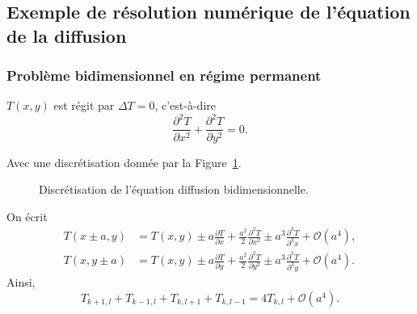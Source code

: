     \subsection{Exemple de résolution numérique de l'équation de la diffusion}
        \subsubsection{Problème bidimensionnel en régime permanent}
            $T(x,y)$ est régit par $\Delta T=0$, c'est-à-dire
            \begin{equation*}
                \frac{\partial^{2}T}{\partial x^{2}}+\frac{\partial^{2}T}{\partial y^{2}}=0.
            \end{equation*}

            Avec une discrétisation donnée par la Figure~\ref{fig:discretisation_equation_diffusion_bidimensionnelle}.

            \begin{figure}
                \centering
                \caption{Discrétisation de l'équation diffusion bidimensionnelle.}    
                \label{fig:discretisation_equation_diffusion_bidimensionnelle}
            \end{figure}

            On écrit 
            \begin{equation*}
                \begin{aligned}
                    T(x\pm a,y)
                    &=T(x,y)\pm a\frac{\partial T}{\partial x}+\frac{a^{2}}{2}\frac{\partial^{2}T}{\partial x^{2}}\pm a^{3}\frac{\partial^{3} T}{\partial^{3}x}+\mathcal{O}(a^{4}),\\
                    T(x,y\pm a)
                    &=T(x,y)\pm a\frac{\partial T}{\partial y}+\frac{a^{2}}{2}\frac{\partial^{2}T}{\partial y^{2}}\pm a^{3}\frac{\partial^{3} T}{\partial^{3} y}+\mathcal{O}(a^{4}).
                \end{aligned}
            \end{equation*}
            Ainsi,
            \begin{equation*}
                \boxed{
                    T_{k+1,l}+T_{k-1,l}+T_{k,l+1}+T_{k,l-1}=4T_{k,l}+\mathcal{O}(a^{4}).
                }
            \end{equation*}